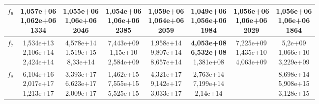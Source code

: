 \begin{table}[t]
\begin{small}
\begin{tabular}{|c|c|c|c|c|c|c|c|}
        $f_6$    & \makecell{1,057e+06 \\ 1,062e+06 \\ 1334}      & \makecell{1,055e+06 \\ 1,06e+06 \\ 2046}       & \makecell{1,054e+06 \\ 1,06e+06 \\ 2385}       & \makecell{1,059e+06 \\ 1,064e+06 \\ 2059}      & \makecell{\textbf{1,049e+06} \\ \textbf{1,056e+06} \\ 1984}      & \makecell{1,056e+06 \\ 1,06e+06 \\ 2029}       & \makecell{1,056e+06 \\ 1,06e+06 \\ 1864}       \\\hline
        $f_7$    & \makecell{1,534e+13 \\ 2,106e+14 \\ 2,424e+14} & \makecell{4,578e+14 \\ 1,519e+15 \\ 8,33e+14}  & \makecell{7,443e+09 \\ 1,15e+10 \\ 2,584e+09}  & \makecell{1,958e+14 \\ 9,807e+14 \\ 8,657e+14} & \makecell{\textbf{4,053e+08} \\ \textbf{6,532e+08} \\ 1,381e+08} & \makecell{7,225e+09 \\ 1,435e+10 \\ 4,063e+09} & \makecell{5,2e+09 \\ 1,066e+10 \\ 3,229e+09}   \\\hline
        $f_8$    & \makecell{6,104e+16 \\ 2,017e+17 \\ 1,213e+17} & \makecell{3,393e+17 \\ 6,623e+17 \\ 2,009e+17} & \makecell{1,462e+15 \\ 7,555e+15 \\ 5,525e+15} & \makecell{4,321e+17 \\ 9,142e+17 \\ 3,033e+17} & \makecell{2,763e+14 \\ 7,199e+14 \\ 2,14e+14}  & & \makecell{8,698e+14 \\ 5,908e+15 \\ 3,128e+15} \\\hline

\end{tabular}
\end{small}
\end{table}
